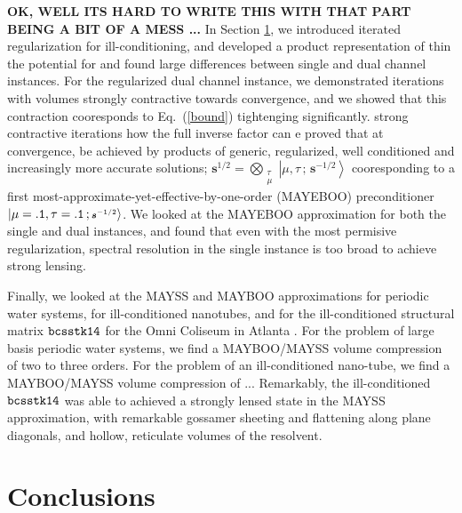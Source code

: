 \documentclass[letterpaper,twocolumn,amsmath,amsfont,amssymb,english,aps,jcp,preprintnumbers,groupaddress,nofootinbib,tightenlines,floatfix]{revtex4}
\newcommand{\mat}[1]{\boldsymbol{#1}}
\theoremstyle{plain}
\theoremstyle{remark}
\theoremstyle{plain}
\begin{document}
{\bf OK, WELL ITS HARD TO WRITE THIS WITH THAT PART BEING A BIT OF A MESS ...}
In Section \ref{},  we introduced iterated regularization for ill-conditioning, and developed 
a product representation of thin 
 the potential for
 and found large differences between
single and dual channel instances.   For the regularized dual channel instance, we demonstrated iterations with 
volumes strongly contractive towards convergence, and we showed that this contraction cooresponds to   
Eq.~(\ref{bound}) tightenging significantly.   
strong contractive iterations 
how the full inverse factor can 
e proved that at convergence, 
be achieved by products of generic, regularized, well conditioned and increasingly more accurate solutions;
$\mat{s}^{1/2} = \bigotimes_{\substack{\tau \\ \mu } }  \left| \mu , \tau \, ;  \, \scriptstyle{\mat{s}^{-1/2}} \right>$
cooresponding to a first most-approximate-yet-effective-by-one-order (MAYEBOO) preconditioner
$ \left| \mu={\tt .1} , \tau = {\tt .1} \, ;  \, \scriptstyle{\mat{s}^{-1/2}} \right>$.   
We looked at the MAYEBOO approximation for both the single and dual instances, and found that even with the most
permisive regularization, spectral resolution in the single instance is too broad to achieve strong lensing.  

Finally, we looked at the MAYSS and MAYBOO approximations for periodic water systems, for ill-conditioned nanotubes, 
and for the ill-conditioned structural matrix ${\tt bcsstk14}$ for the Omni Coliseum in Atlanta \cite{}.  For the
problem of large basis periodic water systems, we find a MAYBOO/MAYSS volume compression of two to three orders. 
For the problem of an ill-conditioned nano-tube, we find a MAYBOO/MAYSS volume compression  of ...    
Remarkably, the ill-conditioned ${\tt bcsstk14}$ was able to achieved a strongly lensed state 
in the  MAYSS approximation, with remarkable gossamer sheeting and flattening along plane diagonals, 
and hollow, reticulate volumes of the resolvent.


\section{Conclusions}
\end{document}
